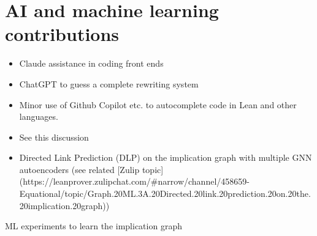 \section{AI and machine learning contributions}


\begin{itemize}
\item Claude assistance in coding front ends
\item ChatGPT to guess a complete rewriting system
\item Minor use of Github Copilot etc. to autocomplete code in Lean and other languages.
\item See this discussion
\item Directed Link Prediction (DLP) on the implication graph with multiple GNN autoencoders
  (see related [Zulip topic](https://leanprover.zulipchat.com/#narrow/channel/458659-Equational/topic/Graph.20ML.3A.20Directed.20link.20prediction.20on.20the.20implication.20graph))
\end{itemize}

ML experiments to learn the implication graph
